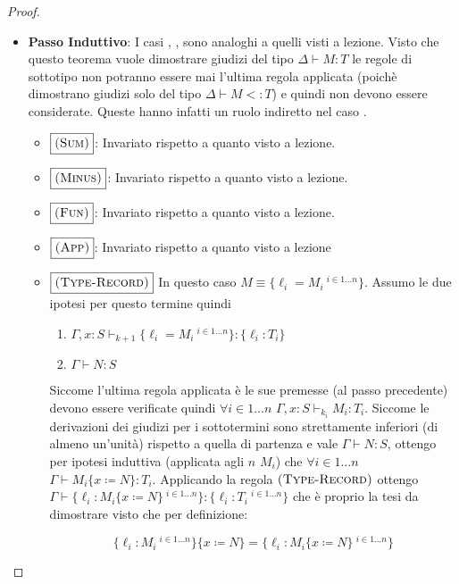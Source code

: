 \begin{proof}
\begin{itemize}
\begin{itemize}
		\item \textbf{Passo Induttivo}:  
		I casi , ,  sono analoghi a quelli visti a lezione. Visto che questo teorema
		vuole dimostrare giudizi del tipo $\Delta \vdash M : T$ le regole di sottotipo non potranno essere mai l'ultima regola 
		applicata (poich\`e dimostrano giudizi solo del tipo $\Delta \vdash M <: T$) e quindi non devono essere considerate. Queste hanno infatti un ruolo
		indiretto nel caso .
		\begin{itemize}
			\item $\boxed{\textsc{(Sum)}}$: Invariato rispetto a quanto visto a lezione.
			\item $\boxed{\textsc{(Minus)}}$: Invariato rispetto a quanto visto a lezione.
			\item $\boxed{\textsc{(Fun)}}$: Invariato rispetto a quanto visto a lezione.
			\item $\boxed{\textsc{(App)}}$: Invariato rispetto a quanto visto a lezione
			\item $\boxed{\textsc{(Type-Record)}}$
			In questo caso $M \equiv \{\ell_i = M_i\ ^{i \in 1 \dots n} \}$. Assumo le due ipotesi per questo termine
			quindi 
			\begin{enumerate}
				\item $\Gamma, x : S \vdash_{k+1} \{\ell_i = M_i\ ^{i \in 1 \dots n}\} : \{\ell_i : T_i\}$
				\item $\Gamma \vdash N : S$
			\end{enumerate}
			Siccome l'ultima regola applicata \`e  le sue premesse (al passo precedente) devono essere verificate quindi
			$\forall i \in 1 \dots n$ $ \Gamma, x : S \vdash_{k_i} M_i : T_i$. 
			Siccome le derivazioni dei giudizi per i sottotermini sono strettamente inferiori (di almeno un'unit\`a) rispetto
			a quella di partenza e vale $\Gamma \vdash N : S$, ottengo per ipotesi induttiva (applicata agli $n$ $M_i$) che
			$\forall i \in 1 \dots n$ $\Gamma \vdash M_i \{x \coloneqq N\} : T_i$.
			Applicando la regola $\textsc{(Type-Record)}$ ottengo
			$\Gamma \vdash \{\ell_i : M_i\{x \coloneqq N\}\ ^{i \in 1 \dots n} \} : \{\ell_i : T_i\ ^{i \in 1 \dots n}\}$ che \`e proprio la tesi da dimostrare visto che per definizione:
			
			$$
			\{\ell_i : M_i\ ^{i \in 1 \dots n}\}\{x \coloneqq N \} = \{\ell_i : M_i\{x \coloneqq N \}\ ^{i \in 1 \dots n}\}
			$$
			

\end{itemize}
\end{itemize}
\end{itemize}
\end{proof}
